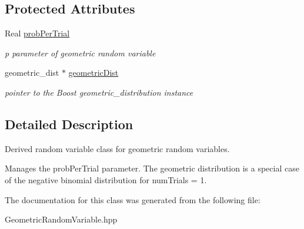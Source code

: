 \subsection*{Protected Attributes}
\begin{DoxyCompactItemize}
\item 
Real \hyperlink{classPecos_1_1GeometricRandomVariable_a034cce918fd6c1433e74212387527794}{prob\+Per\+Trial}\label{classPecos_1_1GeometricRandomVariable_a034cce918fd6c1433e74212387527794}

\begin{DoxyCompactList}\small\item\em p parameter of geometric random variable \end{DoxyCompactList}\item 
geometric\+\_\+dist $\ast$ \hyperlink{classPecos_1_1GeometricRandomVariable_ac420bfe9c236be76e49f0ba14bfe893c}{geometric\+Dist}\label{classPecos_1_1GeometricRandomVariable_ac420bfe9c236be76e49f0ba14bfe893c}

\begin{DoxyCompactList}\small\item\em pointer to the Boost geometric\+\_\+distribution instance \end{DoxyCompactList}\end{DoxyCompactItemize}


\subsection{Detailed Description}
Derived random variable class for geometric random variables. 

Manages the prob\+Per\+Trial parameter. The geometric distribution is a special case of the negative binomial distribution for num\+Trials = 1. 

The documentation for this class was generated from the following file\+:\begin{DoxyCompactItemize}
\item 
Geometric\+Random\+Variable.\+hpp\end{DoxyCompactItemize}
